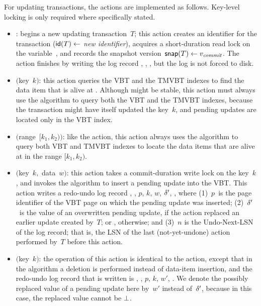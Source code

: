 For updating transactions, the actions are implemented as follows. 
Key-level locking is only required where specifically stated.
\begin{itemize}
  \setlength{\itemsep}{0pt}
 
  \item {}: begins a new updating transaction~$T$;   
  this action creates an identifier for the transaction ($\text{\textsf{id}}(T) \gets$
  \emph{new identifier}), acquires a short-duration read lock on the
  variable~\comver, and records the snapshot version~$\text{\textsf{snap}}(T) \gets
  \smash{v_{\text{\textit{commit}}}}$.
  The action finishes by writing the log record ,
  , , but the log is not forced to disk.

  \item {}$($key~$k)$: this action queries the VBT and the TMVBT
  indexes to find the data item that is alive at .
  Although  might be stable, this action must always use
  the  algorithm to query both the VBT and the TMVBT
  indexes, because the transaction might have itself updated the key~$k$, and
  pending updates are located only in the VBT index. 

  \item {}$($range~$[k_1, k_2))$: like the 
  action, this action always uses the  algorithm to
  query both VBT and TMVBT indexes to locate the data items that are alive at
   in the range $[k_1, k_2)$.

  \item {}$($key~$k,$ data~$w)$: this action takes a
  commit-duration write lock on the key~$k$, and invokes the
   algorithm to insert a pending update into the VBT\@. 
  This action writes a redo-undo log record
  , , $p$, $k$, $w$, $\delta'$, , where
  (1)~$p$~is the page identifier of the VBT page on which the pending update
  was inserted; 
  (2)~$\delta'$~is the value of an overwritten pending update, if
  the action replaced an earlier update created by~$T$; or
  \nullmark, otherwise; and 
  (3)~$n$ is the Undo-Next-LSN of the log record; that is, the
  LSN of the last (not-yet-undone) action performed by~$T$
  before this action.

  \item {}$($key~$k)$: the operation of this action is identical
  to the  action, except that in the  algorithm
  a deletion is performed instead of data-item insertion, and the
  redo-undo log record that is written is , , $p$, $k$,
  $w'$, . 
  We denote the possibly replaced value of a pending update here by~$w'$
  instead of~$\delta'$, because in this case, the replaced value cannot
  be $\bot$.


\end{itemize}
